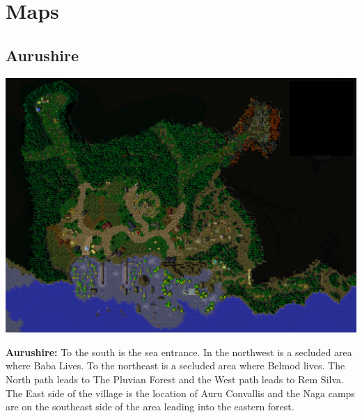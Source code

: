 \onecolumn
\chapter{Maps} \label{maps}
\section{Aurushire}
\begin{center}
	\includegraphics[width=\linewidth]{img/Aurushire.png}
	
	{\textbf{Aurushire:} To the south is the sea entrance. In the northwest is a secluded area where Baba Lives. To the northeast is a secluded area where Belmod lives. The North path leads to The Pluvian Forest and the West path leads to Rem Silva. The East side of the village is the location of Auru Convallis and the Naga camps are on the southeast side of the area leading into the eastern forest.}
\end{center}

